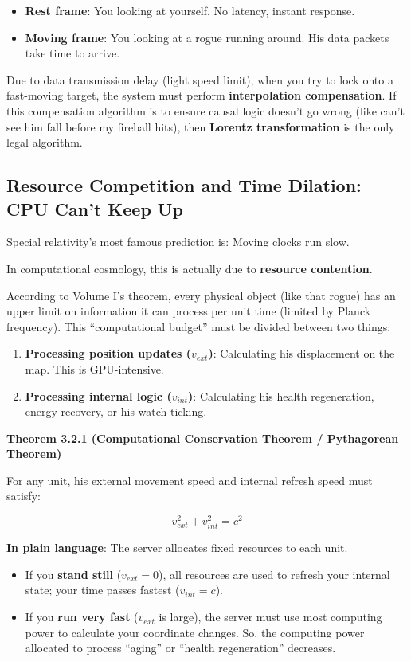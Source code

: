\begin{itemize}
\item \textbf{Rest frame}: You looking at yourself. No latency, instant response.
\item \textbf{Moving frame}: You looking at a rogue running around. His data packets take time to arrive.
\end{itemize}

Due to data transmission delay (light speed limit), when you try to lock onto a fast-moving target, the system must perform \textbf{interpolation compensation}. If this compensation algorithm is to ensure causal logic doesn't go wrong (like can't see him fall before my fireball hits), then \textbf{Lorentz transformation} is the only legal algorithm.

\subsection{Resource Competition and Time Dilation: CPU Can't Keep Up}

Special relativity's most famous prediction is: Moving clocks run slow.

In computational cosmology, this is actually due to \textbf{resource contention}.

According to Volume I's theorem, every physical object (like that rogue) has an upper limit on information it can process per unit time (limited by Planck frequency). This ``computational budget'' must be divided between two things:

\begin{enumerate}
\item \textbf{Processing position updates ($v_{ext}$)}: Calculating his displacement on the map. This is GPU-intensive.
\item \textbf{Processing internal logic ($v_{int}$)}: Calculating his health regeneration, energy recovery, or his watch ticking.
\end{enumerate}

\textbf{Theorem 3.2.1 (Computational Conservation Theorem / Pythagorean Theorem)}

For any unit, his external movement speed and internal refresh speed must satisfy:

\[
v_{ext}^2 + v_{int}^2 = c^2
\]

\textbf{In plain language}: The server allocates fixed resources to each unit.

\begin{itemize}
\item If you \textbf{stand still} ($v_{ext}=0$), all resources are used to refresh your internal state; your time passes fastest ($v_{int}=c$).
\item If you \textbf{run very fast} ($v_{ext}$ is large), the server must use most computing power to calculate your coordinate changes. So, the computing power allocated to process ``aging'' or ``health regeneration'' decreases.
\end{itemize}

